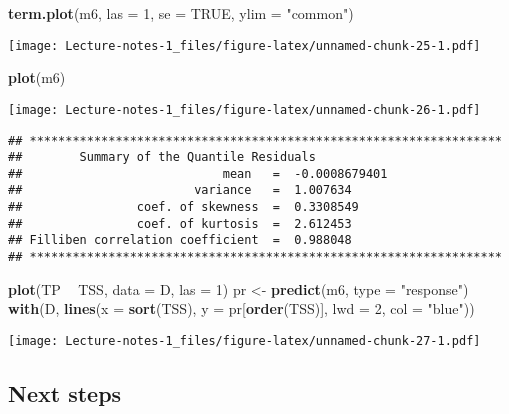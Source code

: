 \documentclass[
]{book}
\newenvironment{Shaded}{\begin{snugshade}}{\end{snugshade}}
\newcommand{\DataTypeTok}[1]{\textcolor[rgb]{0.13,0.29,0.53}{#1}}
\newcommand{\DecValTok}[1]{\textcolor[rgb]{0.00,0.00,0.81}{#1}}
\newcommand{\KeywordTok}[1]{\textcolor[rgb]{0.13,0.29,0.53}{\textbf{#1}}}
\newcommand{\NormalTok}[1]{#1}
\newcommand{\OperatorTok}[1]{\textcolor[rgb]{0.81,0.36,0.00}{\textbf{#1}}}
\newcommand{\OtherTok}[1]{\textcolor[rgb]{0.56,0.35,0.01}{#1}}
\newcommand{\StringTok}[1]{\textcolor[rgb]{0.31,0.60,0.02}{#1}}
\begin{document}
\begin{Shaded}
\begin{Highlighting}[]
\KeywordTok{term.plot}\NormalTok{(m6, }\DataTypeTok{las =} \DecValTok{1}\NormalTok{, }\DataTypeTok{se =} \OtherTok{TRUE}\NormalTok{, }\DataTypeTok{ylim =} \StringTok{"common"}\NormalTok{)}
\end{Highlighting}
\end{Shaded}

\texttt{[image: Lecture-notes-1\_files/figure-latex/unnamed-chunk-25-1.pdf]}

\begin{Shaded}
\begin{Highlighting}[]
\KeywordTok{plot}\NormalTok{(m6)}
\end{Highlighting}
\end{Shaded}

\texttt{[image: Lecture-notes-1\_files/figure-latex/unnamed-chunk-26-1.pdf]}

\begin{verbatim}
## ******************************************************************
##        Summary of the Quantile Residuals
##                            mean   =  -0.0008679401 
##                        variance   =  1.007634 
##                coef. of skewness  =  0.3308549 
##                coef. of kurtosis  =  2.612453 
## Filliben correlation coefficient  =  0.988048 
## ******************************************************************
\end{verbatim}

\begin{Shaded}
\begin{Highlighting}[]
\KeywordTok{plot}\NormalTok{(TP }\OperatorTok{~}\StringTok{ }\NormalTok{TSS, }\DataTypeTok{data =}\NormalTok{ D, }\DataTypeTok{las =} \DecValTok{1}\NormalTok{)}
\NormalTok{pr <-}\StringTok{ }\KeywordTok{predict}\NormalTok{(m6, }\DataTypeTok{type =} \StringTok{"response"}\NormalTok{)}
\KeywordTok{with}\NormalTok{(D, }\KeywordTok{lines}\NormalTok{(}\DataTypeTok{x =} \KeywordTok{sort}\NormalTok{(TSS), }\DataTypeTok{y =}\NormalTok{ pr[}\KeywordTok{order}\NormalTok{(TSS)],}
              \DataTypeTok{lwd =} \DecValTok{2}\NormalTok{, }\DataTypeTok{col =} \StringTok{"blue"}\NormalTok{))}
\end{Highlighting}
\end{Shaded}

\texttt{[image: Lecture-notes-1\_files/figure-latex/unnamed-chunk-27-1.pdf]}

\hypertarget{next-steps}{%
\subsection{Next steps}\label{next-steps}}
\end{document}
